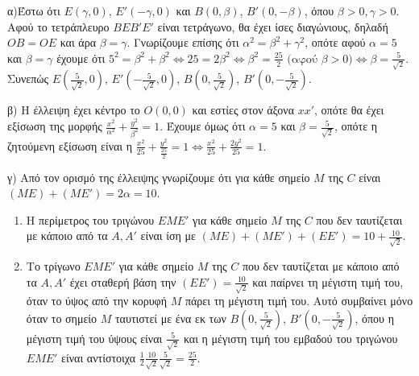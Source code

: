 α)Έστω ότι $E(\gamma,0)$, $E'(-\gamma,0)$ και $B(0,\beta)$, $B'(0,-\beta)$, όπου $\beta>0,\gamma>0$.
Αφού το τετράπλευρο $BEB'E'$ είναι τετράγωνο, θα έχει ίσες διαγώνιους, δηλαδή $OB=OE$ και άρα $\beta=\gamma$. Γνωρίζουμε επίσης ότι $\alpha^2=\beta^2+\gamma^2$, οπότε αφού $\alpha=5$ και $\beta=\gamma$ έχουμε ότι $5^2=\beta^2+\beta^2 \Leftrightarrow 25=2\beta^2 \Leftrightarrow \beta^2=\frac{25}{2} \text{ (αφού } \beta>0) \Leftrightarrow \beta=\frac{5}{\sqrt{2}}$.
Συνεπώς $E\left(\frac{5}{\sqrt{2}},0\right)$, $E'\left(-\frac{5}{\sqrt{2}},0\right)$, $B\left(0,\frac{5}{\sqrt{2}}\right)$, $B'\left(0,-\frac{5}{\sqrt{2}}\right)$.

β) Η έλλειψη έχει κέντρο το $O(0,0)$ και εστίες στον άξονα $xx'$, οπότε θα έχει εξίσωση της μορφής $\frac{x^2}{\alpha^2}+\frac{y^2}{\beta^2}=1$. Έχουμε όμως ότι $\alpha=5$ και $\beta=\frac{5}{\sqrt{2}}$, οπότε η ζητούμενη εξίσωση είναι η $\frac{x^2}{25}+\frac{y^2}{\frac{25}{2}}=1 \Leftrightarrow \frac{x^2}{25}+\frac{2y^2}{25}=1$.

γ) Από τον ορισμό της έλλειψης γνωρίζουμε ότι για κάθε σημείο $M$ της $C$ είναι $(ME)+(ME')=2\alpha=10$.
\begin{enumerate}
    \item[i.] Η περίμετρος του τριγώνου $EME'$ για κάθε σημείο $M$ της $C$ που δεν ταυτίζεται με κάποιο από τα $A,A'$ είναι ίση με $(ME)+(ME')+(EE')=10+\frac{10}{\sqrt{2}}$.
    \item[ii.] Το τρίγωνο $EME'$ για κάθε σημείο $M$ της $C$ που δεν ταυτίζεται με κάποιο από τα $A,A'$ έχει σταθερή βάση την $(EE')=\frac{10}{\sqrt{2}}$ και παίρνει τη μέγιστη τιμή του, όταν το ύψος από την κορυφή $M$ πάρει τη μέγιστη τιμή του. Αυτό συμβαίνει μόνο όταν το σημείο $M$ ταυτιστεί με ένα εκ των $B\left(0,\frac{5}{\sqrt{2}}\right)$, $B'\left(0,-\frac{5}{\sqrt{2}}\right)$, όπου η μέγιστη τιμή του ύψους είναι $\frac{5}{\sqrt{2}}$ και η μέγιστη τιμή του εμβαδού του τριγώνου $EME'$ είναι αντίστοιχα $\frac{1}{2}\frac{10}{\sqrt{2}}\frac{5}{\sqrt{2}}=\frac{25}{2}$.
\end{enumerate}